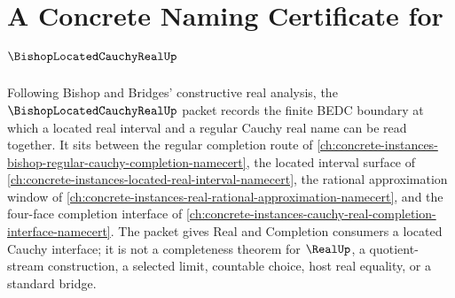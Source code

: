 \chapter{A Concrete Naming Certificate for $\BishopLocatedCauchyRealUp$}
\label{ch:concrete-instances-bishop-located-cauchy-real-namecert}

Following Bishop and Bridges' constructive real analysis, the $\BishopLocatedCauchyRealUp$ packet records the finite BEDC boundary at which a located real interval and a regular Cauchy real name can be read together. It sits between the regular completion route of \autoref{ch:concrete-instances-bishop-regular-cauchy-completion-namecert}, the located interval surface of \autoref{ch:concrete-instances-located-real-interval-namecert}, the rational approximation window of \autoref{ch:concrete-instances-real-rational-approximation-namecert}, and the four-face completion interface of \autoref{ch:concrete-instances-cauchy-real-completion-interface-namecert}. The packet gives Real and Completion consumers a located Cauchy interface; it is not a completeness theorem for $\RealUp$, a quotient-stream construction, a selected limit, countable choice, host real equality, or a standard bridge.

